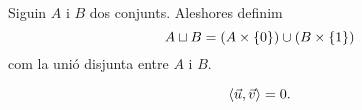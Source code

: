\documentclass[../Apunts.tex]{subfiles}
\begin{document}
	\begin{definition}
		\label{def:unió disjunta}
		Siguin \(A\) i \(B\) dos conjunts. Aleshores definim
		\[A\sqcup B=(A\times\{0\})\cup(B\times\{1\})\]
		com la unió disjunta entre \(A\) i \(B\).
	\end{definition}
	\begin{definition}
		\label{def:vectors perpendiculars}
		\[\prodesc{\vec{u}}{\vec{v}}=0.\]
	\end{definition}
\end{document}
